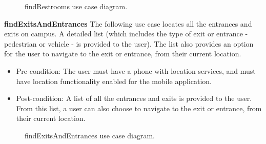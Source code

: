 \documentclass[12pt,a4paper]{article}
\begin{document}
			\begin{figure}[ht!]
				\caption \newline findRestrooms use case diagram.
			\end{figure}

			\textbf{findExitsAndEntrances}
			The following use case locates all the entrances and exits on campus. A detailed list (which includes the type of 				exit or entrance - pedestrian or vehicle - is provided to the user). The list also provides an option for the user 			to navigate to the exit or entrance, from their current location.

			\begin{itemize}
			\item Pre-condition: The user must have a phone with location services, and must have location functionality 						  enabled for the mobile application.
			\item Post-condition: A list of all the entrances and exits is provided to the user. From this list, a user can 					  also choose to navigate to the exit or entrance, from their current location.
			\end{itemize}

			\begin{figure}[ht!]
				\caption \newline findExitsAndEntrances use case diagram.
			\end{figure}
\end{document}
